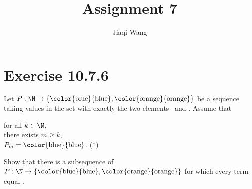 \documentclass{article}
\title{Assignment 7}
\author{Jiaqi Wang}
\newcommand{\blue}{\text{\color{blue}{blue}}}
\newcommand{\orange}{\text{\color{orange}{orange}}}
\begin{document}
    \maketitle
    \section{Exercise 10.7.6}
    \begin{problem}
        Let $P: \N \to \{\blue, \orange\}$ be a sequence taking values in the set with exactly the two elements \blue\ and \orange.
        Assume that
        \begin{center}
            \parbox{\linewidth}{
                \linewidth
                for all $k \in \N$, \\
                \hspace*{1em}there exists $m \ge k$, \\
                \hspace*{2em}$P_m = \blue$. \hfill (*)

            }
        \end{center}

        Show that there is a subsequence of $P: \N \to \{\blue, \orange\}$ for which every term equal \blue.%
    \end{problem}
\end{document}
